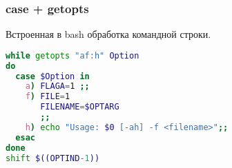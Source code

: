 \begin{frame}[fragile]
	\frametitle{case + getopts}
	
	Встроенная в bash обработка командной строки.

\begin{lstlisting}[language=sh,frame=single]
while getopts "af:h" Option
do
  case $Option in 
    a) FLAGA=1 ;;
    f) FILE=1
       FILENAME=$OPTARG
       ;;
    h) echo "Usage: $0 [-ah] -f <filename>";;
  esac  
done
shift $((OPTIND-1))
\end{lstlisting}
\end{frame}
